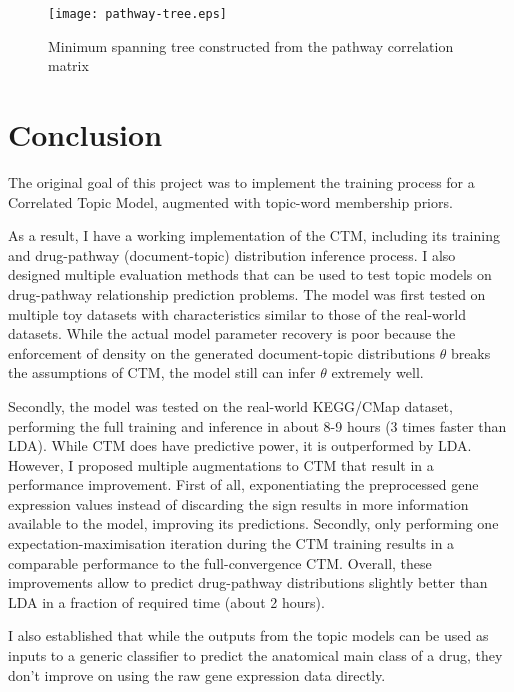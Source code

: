 \documentclass[12pt,a4paper,twoside,openright]{report}
\begin{document}
\begin{landscape}
	
	\begin{figure}[!htb]
		\texttt{[image: pathway-tree.eps]}
		\caption{Minimum spanning tree constructed from the pathway correlation matrix}
		\label{fig:pathway-tree}
	\end{figure}
	
\end{landscape}


\chapter{Conclusion}

The original goal of this project was to implement the training process for a Correlated Topic Model, augmented with topic-word membership priors.

As a result, I have a working implementation of the CTM, including its training and drug-pathway (document-topic) distribution inference process. I also designed multiple evaluation methods that can be used to test topic models on drug-pathway relationship prediction problems. The model was first tested on multiple toy datasets with characteristics similar to those of the real-world datasets. While the actual model parameter recovery is poor because the enforcement of density on the generated document-topic distributions $\theta$ breaks the assumptions of CTM, the model still can infer $\theta$ extremely well.

Secondly, the model was tested on the real-world KEGG/CMap dataset, performing the full training and inference in about 8-9 hours (3 times faster than LDA). While CTM does have predictive power, it is outperformed by LDA. However, I proposed multiple augmentations to CTM that result in a performance improvement. First of all, exponentiating the preprocessed gene expression values instead of discarding the sign results in more information available to the model, improving its predictions. Secondly, only performing one expectation-maximisation iteration during the CTM training results in a comparable performance to the full-convergence CTM. Overall, these improvements allow to predict drug-pathway distributions slightly better than LDA in a fraction of required time (about 2 hours).

I also established that while the outputs from the topic models can be used as inputs to a generic classifier to predict the anatomical main class of a drug, they don't improve on using the raw gene expression data directly.
\end{document}
